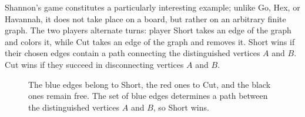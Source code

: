 	Shannon's game constitutes a particularly interesting example; unlike Go, Hex, or Havannah, it does not take place on a board, but rather on an arbitrary finite graph. The two players alternate turns: player Short takes an edge of the graph and colors it, while Cut takes an edge of the graph and removes it. Short wins if their chosen edges contain a path connecting the distinguished vertices $A$ and $B$. Cut wins if they succeed in disconnecting vertices $A$ and $B$.
	\begin{figure}[H]
		\centering
		\caption{The blue edges belong to Short, the red ones to Cut, and the black ones remain free. The set of blue edges determines a path between the distinguished vertices $A$ and $B$, so Short wins.}
	\end{figure}
	
